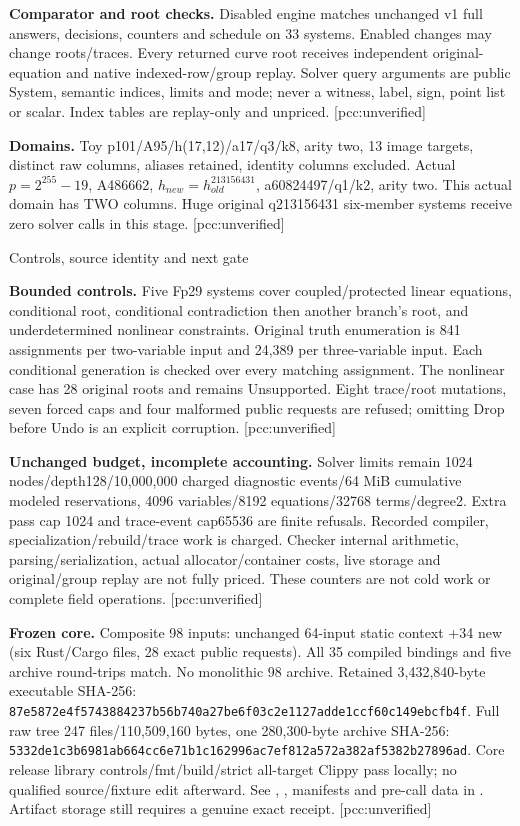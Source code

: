 \documentclass[10pt]{article}
\begin{document}
\textbf{Comparator and root checks.} Disabled engine matches unchanged v1
full answers, decisions, counters and schedule on 33 systems. Enabled changes
may change roots/traces. Every returned curve root receives independent
original-equation and native indexed-row/group replay. Solver query arguments
are public System, semantic indices, limits and mode; never a witness, label,
sign, point list or scalar. Index tables are replay-only and unpriced.
[pcc:unverified]

\textbf{Domains.} Toy p101/A95/h(17,12)/a17/q3/k8, arity two, 13 image targets,
distinct raw columns, aliases retained, identity columns excluded. Actual
$p=2^{255}-19$, A486662, $h_{new}=h_{old}^{213156431}$, a60824497/q1/k2, arity two.
This actual domain has TWO columns. Huge original q213156431 six-member
systems receive zero solver calls in this stage. [pcc:unverified]

\newpage
\begin{center}\Large Controls, source identity and next gate\end{center}
\textbf{Bounded controls.} Five Fp29 systems cover coupled/protected linear
equations, conditional root, conditional contradiction then another branch's
root, and underdetermined nonlinear constraints. Original truth enumeration
is 841 assignments per two-variable input and 24,389 per three-variable input.
Each conditional generation is checked over every matching assignment. The
nonlinear case has 28 original roots and remains Unsupported. Eight trace/root
mutations, seven forced caps and four malformed public requests are refused;
omitting Drop before Undo is an explicit corruption. [pcc:unverified]

\textbf{Unchanged budget, incomplete accounting.} Solver limits remain 1024
nodes/depth128/10,000,000 charged diagnostic events/64 MiB cumulative modeled
reservations, 4096 variables/8192 equations/32768 terms/degree2. Extra pass cap
1024 and trace-event cap65536 are finite refusals. Recorded compiler,
specialization/rebuild/trace work is charged. Checker internal arithmetic,
parsing/serialization, actual allocator/container costs, live storage and
original/group replay are not fully priced. These counters are not cold work
or complete field operations. [pcc:unverified]

\textbf{Frozen core.} Composite 98 inputs: unchanged 64-input static context
+34 new (six Rust/Cargo files, 28 exact public requests). All 35 compiled
bindings and five archive round-trips match. No monolithic 98 archive.
Retained 3,432,840-byte executable SHA-256:\\
\texttt{87e5872e4f5743884237b56b740a27be6f03c2e1127adde1ccf60c149ebcfb4f}.
Full raw tree 247 files/110,509,160 bytes, one 280,300-byte archive SHA-256:\\
\texttt{5332de1c3b6981ab664cc6e71b1c162996ac7ef812a572a382af5382b27896ad}.
Core release library controls/fmt/build/strict all-target Clippy pass locally;
no qualified source/fixture edit afterward. See ,
, manifests and pre-call data in .
Artifact storage still requires a genuine exact receipt. [pcc:unverified]
\end{document}
